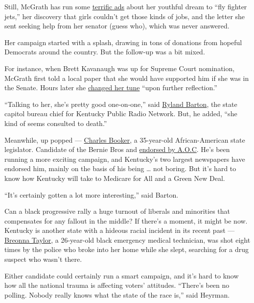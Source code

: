 Still, McGrath has run some
\href{https://www.youtube.com/watch?v=CcjG2fK7kNk}{terrific ads} about
her youthful dream to ``fly fighter jets,'' her discovery that girls
couldn't get those kinds of jobs, and the letter she sent seeking help
from her senator (guess who), which was never answered.

Her campaign started with a splash, drawing in tons of donations from
hopeful Democrats around the country. But the follow-up was a bit mixed.

For instance, when Brett Kavanaugh was up for Supreme Court nomination,
McGrath first told a local paper that she would have supported him if
she was in the Senate. Hours later she
\href{https://www.politico.com/story/2019/07/10/amy-mcgrath-brett-kavanaugh-1405832}{changed
her tune} ``upon further reflection.''

``Talking to her, she's pretty good one-on-one,'' said
\href{https://www.wkyufm.org/people/ryland-barton\#stream/0}{Ryland
Barton}, the state capitol bureau chief for Kentucky Public Radio
Network. But, he added, ``she kind of seems consulted to death.''

Meanwhile, up popped ---
\href{https://www.nytimes3xbfgragh.onion/2020/06/22/us/politics/charles-booker-amy-mcgrath-kentucky-adverstising.html}{Charles
Booker}, a 35-year-old African-American state legislator. Candidate of
the Bernie Bros and
\href{https://www.courier-journal.com/story/news/politics/elections/kentucky/2020/06/09/bernie-sanders-endorses-charles-booker-kentucky-senate-primary/5326417002/}{endorsed
by A.O.C}. He's been running a more exciting campaign, and Kentucky's
two largest newspapers have endorsed him, mainly on the basis of his
being \ldots{} not boring. But it's hard to know how Kentucky will take
to Medicare for All and a Green New Deal.

``It's certainly gotten a lot more interesting,'' said Barton.

Can a black progressive rally a huge turnout of liberals and minorities
that compensates for any fallout in the middle? If there's a moment, it
might be now. Kentucky is another state with a hideous racial incident
in its recent past ---
\href{https://www.nytimes3xbfgragh.onion/article/breonna-taylor-police.html}{Breonna
Taylor}, a 26-year-old black emergency medical technician, was shot
eight times by the police who broke into her home while she slept,
searching for a drug suspect who wasn't there.

Either candidate could certainly run a smart campaign, and it's hard to
know how all the national trauma is affecting voters' attitudes.
``There's been no polling. Nobody really knows what the state of the
race is,'' said Heyrman.

